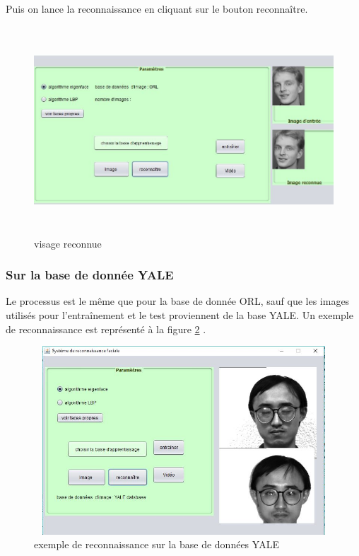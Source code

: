 \begin{enumerate}
	Puis on lance la reconnaissance en cliquant sur le bouton reconnaître.
			\begin{figure}[htbp]
				\centering
					\includegraphics[width=450pt,height=220pt]{imageorlRecognize.JPG}
				\caption{visage reconnue}
				\label{fig:imageorlcharge}
			\end{figure}
		\end{enumerate}	
		
		 \subsubsection{Sur la base de donnée YALE}
		
		Le processus est le même que pour la base de donnée ORL, sauf que les images utilisés pour l'entraînement et le test proviennent de la base YALE. Un exemple de reconnaissance est représenté à la figure \ref{fig:eigenYale} .
		
		\begin{figure}[htbp]
			\centering
				\includegraphics[width=400pt,height=200pt]{eigenYale.JPG}
			\caption{exemple de reconnaissance sur la base de données YALE}
			\label{fig:eigenYale}
		\end{figure}
